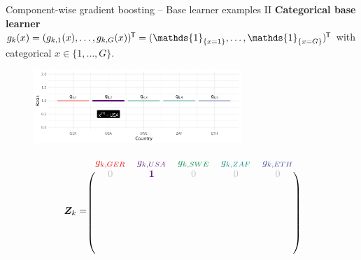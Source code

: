 \documentclass[10pt]{beamer}
\begin{document}
\begin{frame}{Component-wise gradient boosting -- Base learner examples II}
  \textbf{Categorical base learner} $g_k(x) = (g_{k,1}(x), \dots, g_{k,G}(x))^\tran = (\mathds{1}_{\{x = 1\}}, \dots, \mathds{1}_{\{x = G\}})^\tran$ with categorical $x\in\{1, \dots, G\}$.

  \begin{center}
    \begin{figure}
      \includegraphics[width=0.7\textwidth]{figures/bs-cat/fig-cat1.png}
    \end{figure}
    \vspace{-0.5cm}
    \scriptsize
    $$
      \design_k = \begin{blockarray}{ccccc}
        \color[HTML]{EE0000}g_{k,GER} & \color[HTML]{631879}g_{k,USA} & \color[HTML]{008B45}g_{k,SWE} & \color[HTML]{008280}g_{k,ZAF} & \color[HTML]{3B4992}g_{k,ETH}\\
      \begin{block}{(ccccc)}
        \color{lightgray}0 & \color[HTML]{631879}\bm{1} & \color{lightgray}0 & \color{lightgray}0 & \color{lightgray}0 \\
      \color{white}0 & \color{white}0 & \color{white}0 & \color{white}0 & \color{white}0 \\
      \color{white}0 & \color{white}0 & \color{white}0 & \color{white}0 & \color{white}0 \\
      \color{white}\vdots & \color{white}\vdots & \color{white}\vdots & \color{white}\vdots & \color{white}\vdots \\
      \color{white}0 & \color{white}0 & \color{white}0 & \color{white}0 & \color{white}0 \\
      \color{white}0 & \color{white}0 & \color{white}0 & \color{white}0 & \color{white}0 \\
      \color{white}0 & \color{white}0 & \color{white}0 & \color{white}0 & \color{white}0 \color{black}\\
      \end{block}
    \end{blockarray}
    $$
    \normalsize
  \end{center}
\end{frame}
\end{document}
